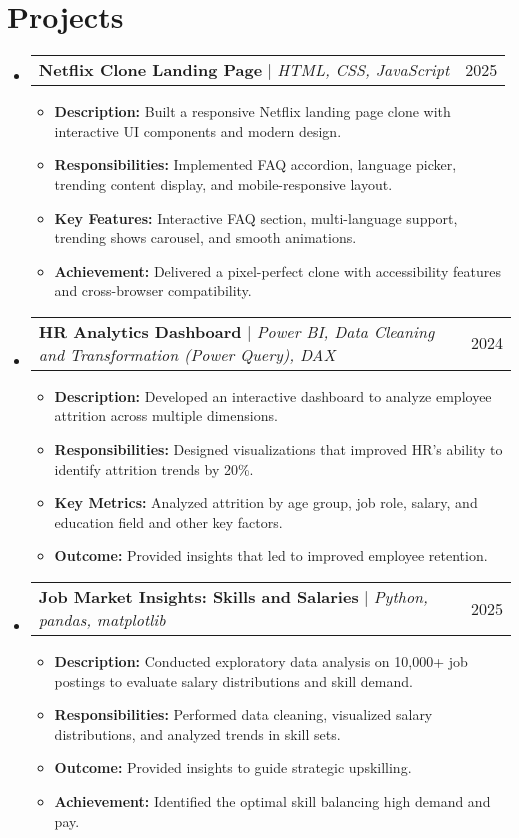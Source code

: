 \documentclass[letterpaper,11pt]{article}
\makeatletter
\newcommand{\resumeItem}[1]{
  \item\small{
    {#1 \vspace{-2pt}}
  }
}
\newcommand{\resumeProjectHeading}[2]{
    \item
    \begin{tabular*}{0.97\textwidth}{l@{\extracolsep{\fill}}r}
      \small#1 & #2 \\
    \end{tabular*}\vspace{-7pt}
}
\newcommand{\resumeSubHeadingListStart}{\begin{itemize}[leftmargin=0.15in, label={}]}
\newcommand{\resumeSubHeadingListEnd}{\end{itemize}}
\newcommand{\resumeItemListStart}{\begin{itemize}}
\newcommand{\resumeItemListEnd}{\end{itemize}\vspace{-5pt}}
\makeatother
\begin{document}
\section{Projects}
    \resumeSubHeadingListStart
      \resumeProjectHeading
          {\textbf{Netflix Clone Landing Page} $|$ \footnotesize\emph{HTML, CSS, JavaScript}}{2025}
          \resumeItemListStart
            \resumeItem{\textbf{Description:} Built a responsive Netflix landing page clone with interactive UI components and modern design.}
            \resumeItem{\textbf{Responsibilities:} Implemented FAQ accordion, language picker, trending content display, and mobile-responsive layout.}
            \resumeItem{\textbf{Key Features:} Interactive FAQ section, multi-language support, trending shows carousel, and smooth animations.\\}
            \resumeItem{\textbf{Achievement:} Delivered a pixel-perfect clone with accessibility features and cross-browser compatibility.}
          \resumeItemListEnd
      \resumeProjectHeading
          {\textbf{HR Analytics Dashboard} $|$ \footnotesize\emph{Power BI, Data Cleaning and Transformation (Power Query), DAX}}{2024}
          \resumeItemListStart
            \resumeItem{\textbf{Description:} Developed an interactive dashboard to analyze employee attrition across multiple dimensions.}
            \resumeItem{\textbf{Responsibilities:} Designed visualizations that improved HR's ability to identify attrition trends by 20\%.}
            \resumeItem{\textbf{Key Metrics:} Analyzed attrition by age group, job role, salary, and education field and other key factors.}
            \resumeItem{\textbf{Outcome:} Provided insights that led to improved employee retention.}
          \resumeItemListEnd
      \resumeProjectHeading
          {\textbf{Job Market Insights: Skills and Salaries} $|$ \footnotesize\emph{Python, pandas, matplotlib}}{2025}
          \resumeItemListStart
            \resumeItem{\textbf{Description:} Conducted exploratory data analysis on 10,000+ job postings to evaluate salary distributions and skill demand.}
            \resumeItem{\textbf{Responsibilities:} Performed data cleaning, visualized salary distributions, and analyzed trends in skill sets.}
            \resumeItem{\textbf{Outcome:} Provided insights to guide strategic upskilling.}
            \resumeItem{\textbf{Achievement:} Identified the optimal skill balancing high demand and pay.}
          \resumeItemListEnd
    \resumeSubHeadingListEnd
\end{document}
